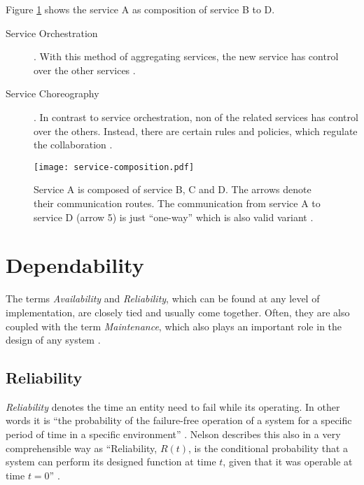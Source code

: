 Figure \ref{fig:service-composition} shows the service A as composition of service B to D.

\begin{description}
	\item [Service Orchestration] .
	With this method of aggregating services, the new service has control over the other services \cite{josuttis}.
	\item [Service Choreography] .
	In contrast to service orchestration, non of the related services has control over the others. Instead, there are certain rules and policies, which regulate the collaboration \cite{josuttis}.
\end{description}

\begin{figure}[ht]
\centering
\texttt{[image: service-composition.pdf]}
\caption{Service A is composed of service B, C and D. The arrows denote their communication routes. The communication from service A to service D (arrow 5) is just ``one-way'' which is also valid variant \cite[p.40]{erl2011}.}
\label{fig:service-composition}
\end{figure}


\section{Dependability}

The terms \emph{Availability} and \emph{Reliability}, which can be found at any level of implementation, are closely tied and usually come together. Often, they are also coupled with the term \emph{Maintenance}, which also plays an important role in the design of any system \cite[p.116]{genesys} \cite{lessner}.

\subsection{Reliability}

\label{sec:reliability}

\emph{Reliability} denotes the time an entity need to fail while its operating. In other words it is ``the probability of the failure-free operation of a system for a specific period of time in a specific environment'' \cite[p.116]{genesys}. Nelson describes this also in a very comprehensible way as ``Reliability, $R(t)$, is the conditional probability that a system can perform its designed function at time $t$, given that it was operable at time $t=0$'' \cite{nelson}.

